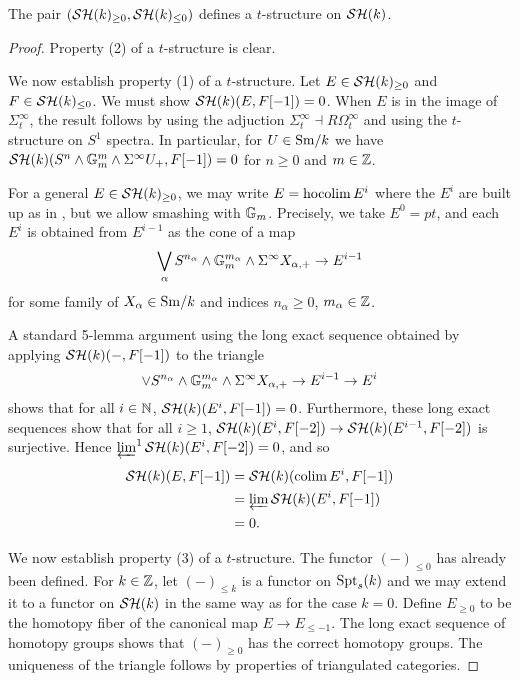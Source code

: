 \documentclass{amsart}%
\begin{document}
\begin{theorem}
  The pair $(\mathcal{SH}(k)_{\geq 0}, \mathcal{SH}(k)_{\leq 0})$ defines a
  $t$-structure on $\mathcal{SH}(k)$.
\end{theorem}

\begin{proof}
  Property (2) of a $t$-structure is clear.
  
  We now establish property (1) of a $t$-structure. Let
  $E \in \mathcal{SH}(k)_{\geq 0}$ and $F \in \mathcal{SH}(k)_{\leq 0}$. We must show
  $\mathcal{SH}(k)(E,F[-1])=0$.  When $E$ is in the image of
  $\Sigma^{\infty}_t$, the result follows by using the adjuction
  $\Sigma^{\infty}_t \dashv R\Omega^{\infty}_t$ and using the
  $t$-structure on $S^1$ spectra. In particular, for $U \in \mathrm{Sm}/k$ we
  have
  $\mathcal{SH}(k)(S^n \wedge \mathbb{G}_m^m \wedge \Sigma^{\infty} U_+, F[-1])=0$
  for $n\geq 0$ and $m \in \mathbb{Z}$.

  For a general $E \in \mathcal{SH}(k)_{\geq 0}$, we may write
  $E = \operatorname{hocolim} E^i$ where the $E^i$ are built up as in
  \cite[3.3.4]{Mor05}, but we allow smashing with $\mathbb{G}_m$.
  Precisely, we take $E^0 = pt$, and each $E^i$ is obtained from
  $E^{i-1}$ as the cone of a map
  \begin{equation*}
    \bigvee_{\alpha}S^{n_{\alpha} }\wedge \mathbb{G}_m^{m_{\alpha}} \wedge \Sigma^{\infty} X_{\alpha, +} 
    \to E^{i-1}
  \end{equation*}
  for some family of $X_{\alpha} \in \mathrm{Sm}/k$ and indices
  $n_{\alpha}\geq 0$, $m_{\alpha}\in \mathbb{Z}$. 

  A standard 5-lemma argument using the long exact sequence obtained
  by applying $\mathcal{SH}(k)(-, F[-1])$ to the triangle
  \begin{equation*}
    \vee S^{n_{\alpha} }\wedge \mathbb{G}_m^{m_{\alpha}} \wedge \Sigma^{\infty} X_{\alpha, +} \to E^{i-1} \to E^i
  \end{equation*}
  shows that for all $i\in \mathbb{N}$, $\mathcal{SH}(k)(E^i,F[-1])=0$. Furthermore,
  these long exact sequences show that for all $i\geq 1$,
  $\mathcal{SH}(k)(E^{i},F[-2]) \to \mathcal{SH}(k)(E^{i-1}, F[-2])$ is
  surjective. Hence $\operatorname{\underleftarrow{\lim}}^{1} \mathcal{SH}(k)(E^{i}, F[-2]) = 0$, and
  so
  \begin{align*}
    \mathcal{SH}(k)(E, F[-1]) & = \mathcal{SH}(k)(\operatorname{colim} E^i, F[-1]) \\
                     & = \operatorname{\underleftarrow{\lim}} \mathcal{SH}(k)(E^i, F[-1]) \\
                     & = 0.
  \end{align*}

  We now establish property (3) of a $t$-structure.  The functor
  $(-)_{\leq 0}$ has already been defined. For $k\in\mathbb{Z}$, let
  $(-)_{\leq k}$ is a functor on $\mathrm{Spt}_s(k)$ and we may extend it to a
  functor on $\mathcal{SH}(k)$ in the same way as for the case $k=0$. Define
  $E_{\geq 0}$ to be the homotopy fiber of the canonical map
  $E \to E_{\leq -1}$. The long exact sequence of homotopy groups
  shows that $(-)_{\geq 0}$ has the correct homotopy groups. The
  uniqueness of the triangle follows by properties of triangulated
  categories.
\end{proof}
\end{document}
